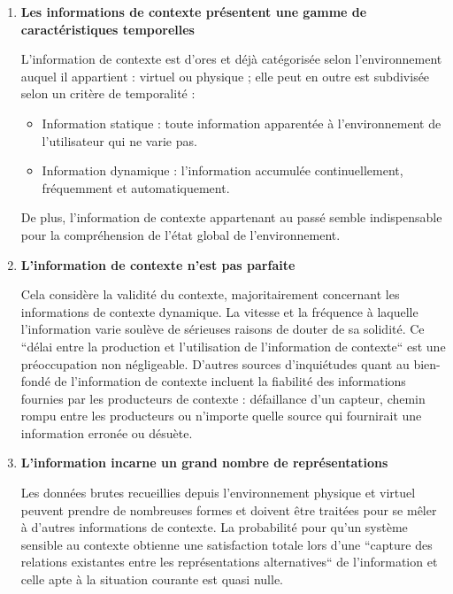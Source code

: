 \begin{enumerate}
    \item \textbf{Les informations de contexte présentent une gamme de
        caractéristiques temporelles}

        L'information de contexte est d'ores et déjà catégorisée selon
        l'environnement auquel il appartient : virtuel ou physique ; elle
        peut en outre est subdivisée selon un critère de temporalité :

        \begin{itemize}
            \item Information statique : toute information apparentée à
            	l'environnement de l'utilisateur qui ne varie pas.
            \item Information dynamique : l'information accumulée
            	continuellement, fréquemment et automatiquement.
        \end{itemize}

        De plus, l'information de contexte appartenant au passé semble
        indispensable pour la compréhension de l'état global de l'environnement.

    \item \textbf{L'information de contexte n'est pas parfaite}

        Cela considère la validité du contexte, majoritairement concernant
        les informations de contexte dynamique. La vitesse et la fréquence à
        laquelle l'information varie soulève de sérieuses raisons de
        douter de sa solidité. Ce ``délai entre la production et
        l'utilisation de l'information de contexte``
        \cite{catharina_context_2002} est une préoccupation non négligeable.
        D'autres sources d'inquiétudes quant au bien-fondé de l'information de
        contexte incluent la fiabilité des informations fournies par les
        producteurs de contexte : défaillance d'un capteur, chemin rompu entre
        les producteurs ou n'importe quelle source qui fournirait une
        information erronée ou désuète.

    \item \textbf{L'information incarne un grand nombre de représentations}

        Les données brutes recueillies depuis l'environnement physique et
        virtuel peuvent prendre de nombreuses formes et doivent être traitées
        pour se mêler à d'autres informations de contexte. La probabilité pour
        qu'un système sensible au contexte obtienne une satisfaction totale
        lors d'une ``capture des relations existantes entre les représentations
        alternatives`` \cite{catharina_context_2002}  de l'information et celle
        apte à la situation courante est quasi nulle.


\end{enumerate}
